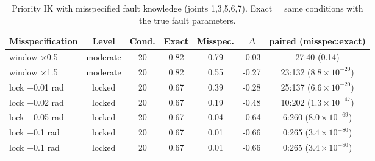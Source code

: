 \begin{table}[t]
\centering
\caption{Priority IK with misspecified fault knowledge (joints 1,3,5,6,7). Exact = same conditions with the true fault parameters.}
\label{tab:misspec}
\setlength{\tabcolsep}{3pt}
\begin{tabular}{lcccccc}
\toprule
Misspecification & Level & Cond. & Exact & Misspec. & $\Delta$ & paired (misspec:exact) \\
\midrule
window $\times$0.5 & moderate & 20 & 0.82 & 0.79 & -0.03 & 27:40 (0.14) \\
window $\times$1.5 & moderate & 20 & 0.82 & 0.55 & -0.27 & 23:132 ($8.8\times10^{-20}$) \\
lock +0.01 rad & locked & 20 & 0.67 & 0.39 & -0.28 & 25:137 ($6.6\times10^{-20}$) \\
lock +0.02 rad & locked & 20 & 0.67 & 0.19 & -0.48 & 10:202 ($1.3\times10^{-47}$) \\
lock +0.05 rad & locked & 20 & 0.67 & 0.04 & -0.64 & 6:260 ($8.0\times10^{-69}$) \\
lock +0.1 rad & locked & 20 & 0.67 & 0.01 & -0.66 & 0:265 ($3.4\times10^{-80}$) \\
lock $-$0.1 rad & locked & 20 & 0.67 & 0.01 & -0.66 & 0:265 ($3.4\times10^{-80}$) \\
\bottomrule
\end{tabular}
\end{table}
